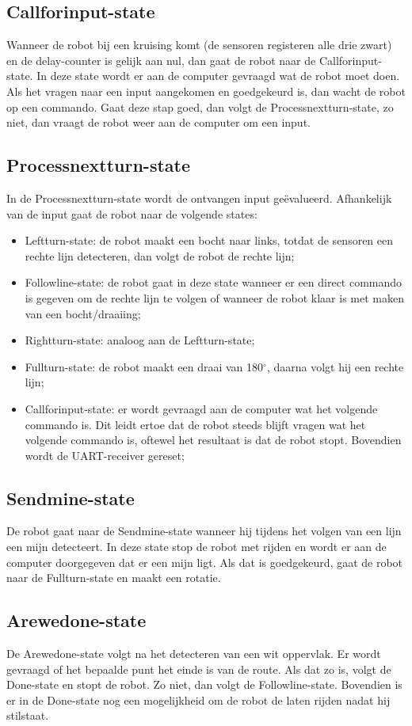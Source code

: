 \documentclass{report}
\begin{document}
\subsection{Callforinput-state}
Wanneer de robot bij een kruising komt (de sensoren registeren alle drie zwart) en de delay-counter is gelijk aan nul, dan gaat de robot naar de Callforinput-state. In deze state wordt er aan de computer gevraagd wat de robot moet doen. Als het vragen naar een input aangekomen en goedgekeurd is, dan wacht de robot op een commando. Gaat deze stap goed, dan volgt de Processnextturn-state, zo niet, dan vraagt de robot weer aan de computer om een input.

\subsection{Processnextturn-state}
In de Processnextturn-state wordt de ontvangen input ge\"{e}valueerd. Afhankelijk van de input gaat de robot naar de volgende states:
\begin{itemize}
\item Leftturn-state: de robot maakt een bocht naar links, totdat de sensoren een rechte lijn detecteren, dan volgt de robot de rechte lijn;
\item Followline-state: de robot gaat in deze state wanneer er een direct commando is gegeven om de rechte lijn te volgen of wanneer de robot klaar is met maken van een bocht/draaiing;
\item Rightturn-state: analoog aan de Leftturn-state;
\item Fullturn-state: de robot maakt een draai van 180$^\circ$, daarna volgt hij een rechte lijn;
\item Callforinput-state: er wordt gevraagd aan de computer wat het volgende commando is. Dit leidt ertoe dat de robot steeds blijft vragen wat het volgende commando is, oftewel het resultaat is dat de robot stopt. Bovendien wordt de UART-receiver gereset;
\end{itemize} 

\subsection{Sendmine-state}
De robot gaat naar de Sendmine-state wanneer hij tijdens het volgen van een lijn een mijn detecteert. In deze state stop de robot met rijden en wordt er aan de computer doorgegeven dat er een mijn ligt. Als dat is goedgekeurd, gaat de robot naar de Fullturn-state en maakt een rotatie.

\subsection{Arewedone-state}
De Arewedone-state volgt na het detecteren van een wit oppervlak. Er wordt gevraagd of het bepaalde punt het einde is van de route. Als dat zo is, volgt de Done-state en stopt de robot. Zo niet, dan volgt de Followline-state. Bovendien is er in de Done-state nog een mogelijkheid om de robot de laten rijden nadat hij stilstaat.
\end{document}
